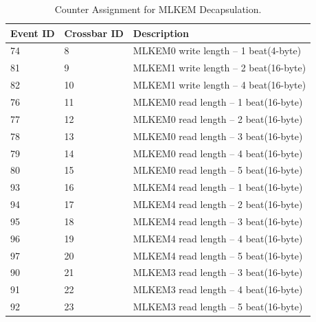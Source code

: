 \begin{table}[H]
	\caption{Counter Assignment for MLKEM Decapsulation. }
	\label{table:t_decap}
	\centering
		\begin{tabular}{|l|l|l|}
			\hline
			\textbf{Event ID} & \textbf{Crossbar ID} & \textbf{Description}\\
			\hline

74  & 8  & MLKEM0 write length -- 1 beat(4-byte)  \\
81  & 9  & MLKEM1 write length -- 2 beat(16-byte) \\
82  & 10 & MLKEM1 write length -- 4 beat(16-byte) \\
76  & 11 & MLKEM0 read  length -- 1 beat(16-byte) \\
77  & 12 & MLKEM0 read  length -- 2 beat(16-byte) \\
78  & 13 & MLKEM0 read  length -- 3 beat(16-byte) \\
79  & 14 & MLKEM0 read  length -- 4 beat(16-byte) \\
80  & 15 & MLKEM0 read  length -- 5 beat(16-byte) \\
93  & 16 & MLKEM4 read  length -- 1 beat(16-byte) \\
94  & 17 & MLKEM4 read  length -- 2 beat(16-byte) \\
95  & 18 & MLKEM4 read  length -- 3 beat(16-byte) \\
96  & 19 & MLKEM4 read  length -- 4 beat(16-byte) \\
97  & 20 & MLKEM4 read  length -- 5 beat(16-byte) \\
90  & 21 & MLKEM3 read  length -- 3 beat(16-byte) \\
91  & 22 & MLKEM3 read  length -- 4 beat(16-byte) \\
92  & 23 & MLKEM3 read  length -- 5 beat(16-byte) \\
	\hline
		\end{tabular}
\end{table}
